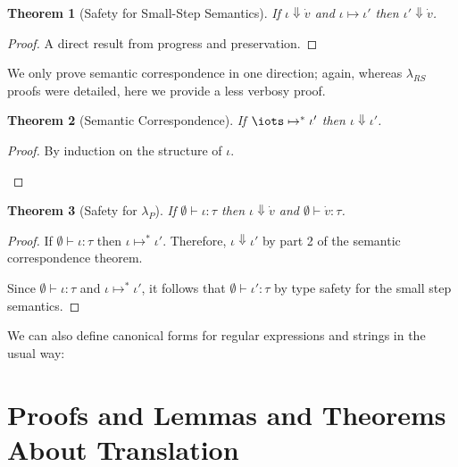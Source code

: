 \documentclass[11pt,leqno]{article}
\newtheorem{thm}{Theorem}
\theoremstyle{definition}
\newcommand{\lambdas}{\lambda_{RS}}
\newcommand{\lambdap}{\lambda_P}
\newcommand{\sreduces}{ \Downarrow }
\begin{document}
\begin{thm}[Safety for Small-Step Semantics]
If $\iota \sreduces \dot{v}$ and $\iota \mapsto \iota'$ then $\iota' \sreduces \dot{v}$. 
\end{thm}
\begin{proof}
A direct result from progress and preservation.
\end{proof}

We only prove semantic correspondence in one direction; again, whereas $\lambdas$ proofs
were detailed, here we provide a less verbosy proof.

\begin{thm}[Semantic Correspondence]
If $\iots \mapsto^* \iota'$ then $\iota \sreduces \iota'$.
\end{thm}
\begin{proof}
By induction on the structure of $\iota$.


\begin{itemize}[label=$ $,itemsep=1ex]
\end{itemize}
\end{proof}

\begin{thm}[Safety for $\lambdap$] If $\emptyset \vdash \iota : \tau$ 
  then $\iota \sreduces \dot v$ and $\emptyset \vdash \dot v : \tau$.
\end{thm}
\begin{proof}
If $\emptyset \vdash \iota : \tau$ then $\iota \mapsto^* \iota'$.
Therefore, $\iota \sreduces \iota'$ by part 2 of the semantic correspondence theorem.

Since $\emptyset \vdash \iota : \tau$ and $\iota \mapsto^* \iota'$, it follows that $\emptyset \vdash \iota' : \tau$ by type safety for the small step semantics.

\end{proof}

We can also define canonical forms for regular expressions and strings in the usual way:



\section{Proofs and Lemmas and Theorems About Translation}
\end{document}
